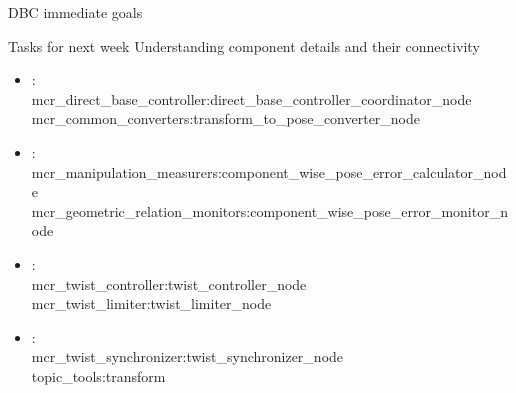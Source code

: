 \documentclass[9pt,usenames,dvipsnames]{beamer}
\begin{document}
\begin{frame}{DBC immediate goals}
	\begin{alertblock}{Tasks for next week}
	Understanding component details and their connectivity
    	\begin{itemize}
    	\item {\color{OliveGreen}{Aaqib}}:\\
    	mcr\_direct\_base\_controller:direct\_base\_controller\_coordinator\_node \\
    	mcr\_common\_converters:transform\_to\_pose\_converter\_node
    	\item {\color{OliveGreen}{Pranjal}}:\\
    	mcr\_manipulation\_measurers:component\_wise\_pose\_error\_calculator\_node \\
    	mcr\_geometric\_relation\_monitors:component\_wise\_pose\_error\_monitor\_node
    	\item {\color{OliveGreen}{Ramit}}:\\
    	mcr\_twist\_controller:twist\_controller\_node\\
    	mcr\_twist\_limiter:twist\_limiter\_node
    	\item {\color{OliveGreen}{Zahid}}:\\
    	mcr\_twist\_synchronizer:twist\_synchronizer\_node \\
    	topic\_tools:transform
    	\end{itemize}
    \end{alertblock}
\end{frame}

\end{document}
